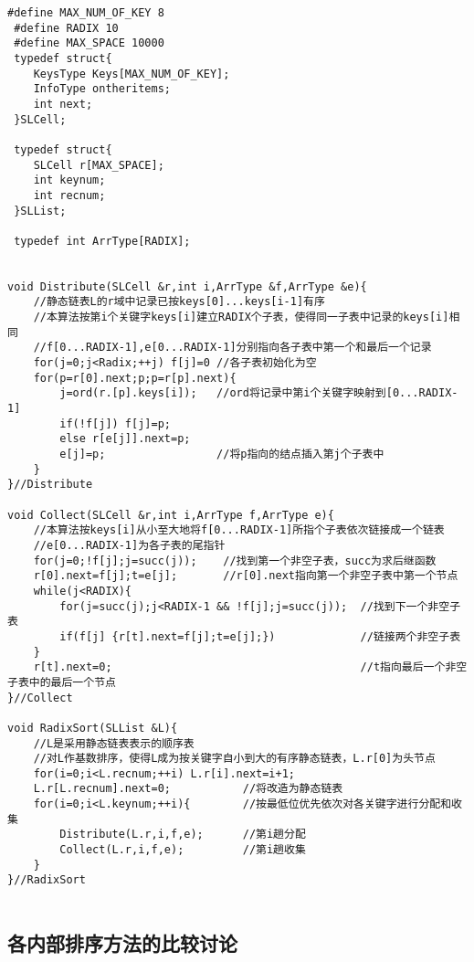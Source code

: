 \documentclass[UTF8]{ctexart}
\begin{document}
\begin{lstlisting}[style=v1]
 #define MAX_NUM_OF_KEY 8
 #define RADIX 10
 #define MAX_SPACE 10000
 typedef struct{
    KeysType Keys[MAX_NUM_OF_KEY];
    InfoType ontheritems;
    int next;
 }SLCell;

 typedef struct{
    SLCell r[MAX_SPACE];
    int keynum;
    int recnum;
 }SLList;

 typedef int ArrType[RADIX];


void Distribute(SLCell &r,int i,ArrType &f,ArrType &e){
    //静态链表L的r域中记录已按keys[0]...keys[i-1]有序
    //本算法按第i个关键字keys[i]建立RADIX个子表，使得同一子表中记录的keys[i]相同
    //f[0...RADIX-1],e[0...RADIX-1]分别指向各子表中第一个和最后一个记录
    for(j=0;j<Radix;++j) f[j]=0 //各子表初始化为空
    for(p=r[0].next;p;p=r[p].next){
        j=ord(r.[p].keys[i]);   //ord将记录中第i个关键字映射到[0...RADIX-1]
        if(!f[j]) f[j]=p;
        else r[e[j]].next=p;
        e[j]=p;                 //将p指向的结点插入第j个子表中
    }
}//Distribute

void Collect(SLCell &r,int i,ArrType f,ArrType e){
    //本算法按keys[i]从小至大地将f[0...RADIX-1]所指个子表依次链接成一个链表
    //e[0...RADIX-1]为各子表的尾指针
    for(j=0;!f[j];j=succ(j));    //找到第一个非空子表，succ为求后继函数
    r[0].next=f[j];t=e[j];       //r[0].next指向第一个非空子表中第一个节点
    while(j<RADIX){
        for(j=succ(j);j<RADIX-1 && !f[j];j=succ(j));  //找到下一个非空子表
        if(f[j] {r[t].next=f[j];t=e[j];})             //链接两个非空子表 
    }                   
    r[t].next=0;                                      //t指向最后一个非空子表中的最后一个节点 
}//Collect

void RadixSort(SLList &L){
    //L是采用静态链表表示的顺序表
    //对L作基数排序，使得L成为按关键字自小到大的有序静态链表，L.r[0]为头节点
    for(i=0;i<L.recnum;++i) L.r[i].next=i+1;
    L.r[L.recnum].next=0;           //将改造为静态链表
    for(i=0;i<L.keynum;++i){        //按最低位优先依次对各关键字进行分配和收集   
        Distribute(L.r,i,f,e);      //第i趟分配
        Collect(L.r,i,f,e);         //第i趟收集
    }
}//RadixSort


\end{lstlisting}


\subsection{各内部排序方法的比较讨论}
\end{document}
